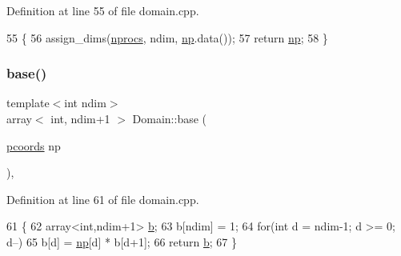 Definition at line 55 of file domain.\+cpp.


\begin{DoxyCode}
55                                                                               \{
56     assign\_dims(\hyperlink{classshark_1_1_group_a90e041a7fa6c40c924b17f8c2006e6b2}{nprocs}, ndim, \hyperlink{classshark_1_1ndim_1_1_domain_a1d15ab99cb54dcc456c5bba8699bcddf}{np}.data());
57         \textcolor{keywordflow}{return} \hyperlink{classshark_1_1ndim_1_1_domain_a1d15ab99cb54dcc456c5bba8699bcddf}{np};
58 \}
\end{DoxyCode}
\hypertarget{classshark_1_1ndim_1_1_domain_a9335637df58667fdf13f6f861281c973}{}\label{classshark_1_1ndim_1_1_domain_a9335637df58667fdf13f6f861281c973} 
\subsubsection{\texorpdfstring{base()}{base()}}
{\footnotesize\ttfamily template$<$int ndim$>$ \\
array$<$ int, ndim+1 $>$ Domain\+::base (\begin{DoxyParamCaption}\item[{\hyperlink{classshark_1_1ndim_1_1_domain_a9684ccd8af33cff7639c782290ac37ee}{pcoords}}]{np }\end{DoxyParamCaption})\hspace{0.3cm}{\ttfamily [static]}, {\ttfamily [private]}}



Definition at line 61 of file domain.\+cpp.


\begin{DoxyCode}
61                                                \{
62     array<int,ndim+1> \hyperlink{classshark_1_1ndim_1_1_domain_a3b9ed7ea09cc2d90575a43f92cc4e105}{b};
63     b[ndim] = 1;
64     \textcolor{keywordflow}{for}(\textcolor{keywordtype}{int} d = ndim-1; d >= 0; d--)
65         b[d] = \hyperlink{classshark_1_1ndim_1_1_domain_a1d15ab99cb54dcc456c5bba8699bcddf}{np}[d] * b[d+1];
66     \textcolor{keywordflow}{return} \hyperlink{classshark_1_1ndim_1_1_domain_a3b9ed7ea09cc2d90575a43f92cc4e105}{b};
67 \}
\end{DoxyCode}
\hypertarget{classshark_1_1ndim_1_1_domain_a494512abfa4490fc22f073e111028d96}{}\label{classshark_1_1ndim_1_1_domain_a494512abfa4490fc22f073e111028d96} 
